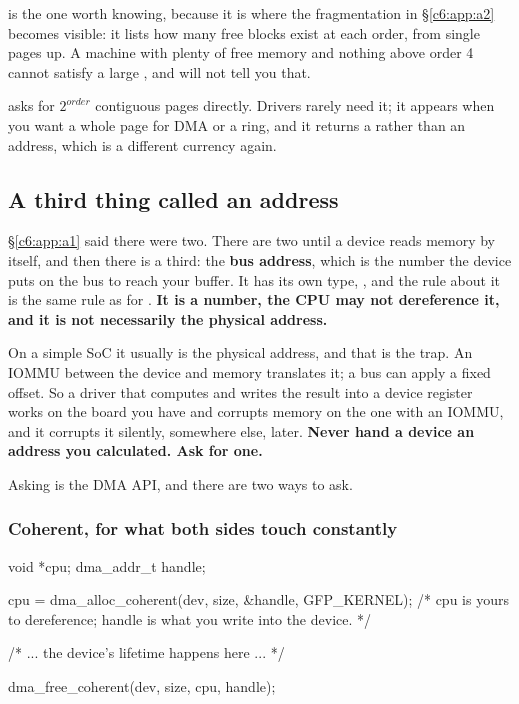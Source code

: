 \noindent {} is the one worth knowing, because it is where the fragmentation in
\S\ref{c6:app:a2} becomes visible: it lists how many free blocks exist at each order, from single
pages up. A machine with plenty of free memory and nothing above order 4 cannot satisfy a large
, and  will not tell you that.

 asks for $2^{\mathit{order}}$ contiguous pages directly. Drivers rarely need
it; it appears when you want a whole page for DMA or a ring, and it returns a 
rather than an address, which is a different currency again.

\subsection{A third thing called an address}
\label{c6:app:a6}

\S\ref{c6:app:a1} said there were two. There are two until a device reads memory by itself, and then
there is a third: the \textbf{bus address}, which is the number the device puts on the bus to reach
your buffer. It has its own type, , and the rule about it is the same rule as for
. \textbf{It is a number, the CPU may not dereference it, and it is not
necessarily the physical address.}

On a simple SoC it usually is the physical address, and that is the trap. An IOMMU between the
device and memory translates it; a bus can apply a fixed offset. So a driver that computes
 and writes the result into a device register works on the board you have
and corrupts memory on the one with an IOMMU, and it corrupts it silently, somewhere else, later.
\textbf{Never hand a device an address you calculated. Ask for one.}

Asking is the DMA API, and there are two ways to ask.

\subsubsection{Coherent, for what both sides touch constantly}
\label{c6:app:a:coherent-for-what-both-sides-touch-constantly}

\begin{ccode}
void *cpu;
dma_addr_t handle;

cpu = dma_alloc_coherent(dev, size, &handle, GFP_KERNEL);
/* cpu is yours to dereference; handle is what you write into the device. */

/* ... the device's lifetime happens here ... */

dma_free_coherent(dev, size, cpu, handle);
\end{ccode}

